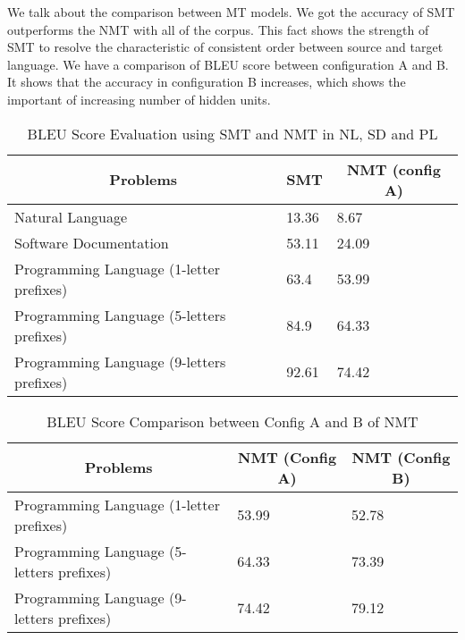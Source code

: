We talk about the comparison between MT models. We got the accuracy of SMT outperforms the NMT with all of the corpus. This fact shows the strength of SMT to resolve the characteristic of consistent order between source and target language. We have a comparison of BLEU score between configuration A and B. It shows that the accuracy in configuration B increases, which shows the important of increasing number of hidden units.




\begin{table}[]
\small
\begin{tabular}{|l|l|l|}
\hline
\multicolumn{1}{|c|}{\textbf{Problems}}   & \multicolumn{1}{c|}{\textbf{SMT}} & \multicolumn{1}{c|}{\textbf{NMT (config A)}} \\ \hline
Natural Language                          & 13.36                             & 8.67                                         \\ \hline
Software Documentation                    & 53.11                             & 24.09                                        \\ \hline
Programming Language (1-letter prefixes)  & 63.4                              & 53.99                                        \\ \hline
Programming Language (5-letters prefixes) & 84.9                              & 64.33                                        \\ \hline
Programming Language (9-letters prefixes) & 92.61                             & 74.42                                        \\ \hline
\end{tabular}
\caption{BLEU Score Evaluation using SMT and NMT in NL, SD and PL}
\label{tblBLEUScoreNLSDPL}
\end{table}

\begin{table*}[]
\small
\begin{tabular}{|l|l|l|}
\hline
\multicolumn{1}{|c|}{\textbf{Problems}}   & \multicolumn{1}{c|}{\textbf{NMT (Config A)}} & \multicolumn{1}{c|}{\textbf{NMT (Config B)}} \\ \hline
Programming Language (1-letter prefixes)  & 53.99                                        & 52.78                                        \\ \hline
Programming Language (5-letters prefixes) & 64.33                                        & 73.39                                        \\ \hline
Programming Language (9-letters prefixes) & 74.42                                        & 79.12                                        \\ \hline
\end{tabular}
\caption{BLEU Score Comparison between Config A and B of NMT}
\label{tblBLEUScoreConfigAAndB}
\end{table*}


